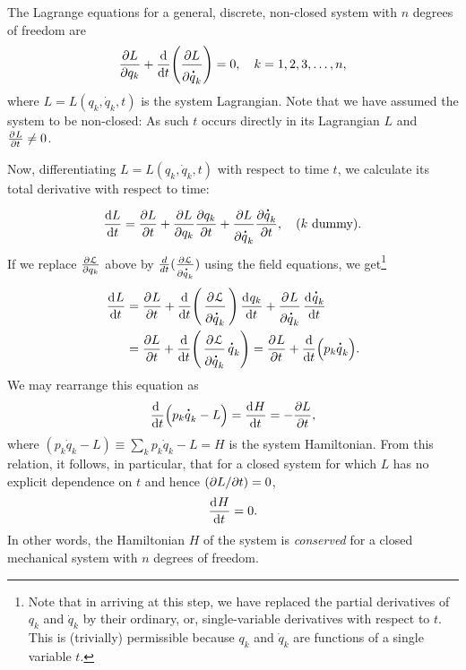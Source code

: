 The Lagrange equations for a general, discrete,  
non-closed system with $n$ degrees of freedom are
\begin{align}\label{rcm.6x}
 \frac{\dow L}{\dow q_k}+ \frac{\dd}{\dd t}
 \Bigg(\frac{\dow L}
{\dow \dot{q}_k} \Bigg)=0,\quad k=1,2,3,\dots, n,
\end{align}
where $L=L(q_k,\dot{q}_k,t)$ is the system Lagrangian. Note 
that we have assumed the system  to be non-closed: As such 
$t$ occurs directly in its Lagrangian $L$ and 
$\pd{L}{t}\neq 
0$.

Now, differentiating $L=L(q_k,\dot{q}_k,t)$ with respect to
time $t$, we calculate its total derivative with respect to 
time:
\begin{align*}
\frac{\dd L}{\dd t} = \frac{\dow L}{\dow t}+ \frac{\dow 
L}{\dow q_k} \frac{\dow q_k}{\dow t} + \frac{\dow L}{\dow 
\dot{q}_k} \frac{\dow \dot{q}_k}{\dow t},
\quad (k\text{ dummy}).
\end{align*}
If we replace $\frac{\partial \EuScript{L}}{\partial q_k} $ 
above by $\frac{d}{dt}(\frac{\partial 
\EuScript{L}}{\partial 
\dot{q}_k}) $ using the field  equations, we 
get\footnote{Note that in arriving at this step, we have 
replaced the partial derivatives of $q_k$ and $\dot{q}_k$ 
by 
their ordinary, or, single-variable derivatives with 
respect 
to $t$. This is (trivially) permissible because $q_k$ and 
$\dot{q}_k$ are functions of a single variable $t$.}
\begin{align*}
\dod{L}{t} &=\dpd{L}{t}+\frac{\dd}{\dd t}
\Bigg(\dpd{\EuScript{L}}{\dot{q}_k} \Bigg)
\dod{q_k}{t}+ \dpd{L}{\dot{q}_k} \dod{\dot{q}_k}{t}\\
& = \frac{\dow L}{\dow t} + \frac{\dd}{\dd t} \Bigg(
\dpd{\EuScript{L}}{\dot{q}_k} \dot{q}_k
\Bigg)=\dpd{L}{t} +
\frac{\dd}{\dd t}\Big(p_k\dot{q}_k\Big).
\end{align*}
We may rearrange this equation as
\begin{align}\label{rcm.8x}
\frac{\dd\;}{\dd t}\Big(p_k \dot{q}_k
-L\Big) =\dod{H}{t}=-\frac{\dow L}{\dow t} ,
\end{align}
where $(p_k \dot{q}_k -L)\equiv \sum_k p_k \dot{q}_k -L=H$ 
is the system  Hamiltonian. From this relation,  it 
follows, in   particular, that for a closed system for 
which $L$ has no explicit dependence on $t$ and hence  
$(\dow L/\dow t)=0$, 
\begin{align}\label{rcm.9x} \dod{H}{t} =0. 
\end{align} 
In other words, the Hamiltonian $H$ of the 
system is  \textsl{conserved} for a closed mechanical 
system with $n$ degrees of freedom.

